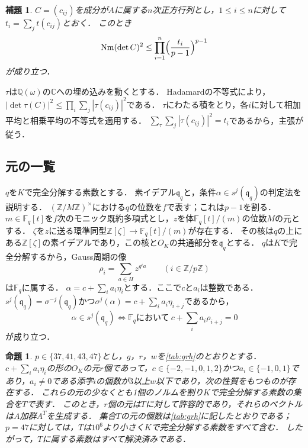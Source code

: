 \documentclass[11pt,a4paper]{ltjsarticle}
\makeatletter
\theoremstyle{ja}
\newtheorem{proposition}[theorem]{命題}
\newtheorem{lemma}[theorem]{補題}
\renewenvironment{proof}[1][証明]{\par
  \pushQED{\qed}\normalfont \topsep6\p@\@plus6\p@\relax
  \trivlist
  \item[\hskip\labelsep\bfseries #1]\hspace{1\zw}\ignorespaces
}{\popQED\endtrivlist\@endpefalse}
\makeatother
\begin{document}
\begin{lemma} \label{lem:hadamard}
$C = (c_{ij})$を成分が$A$に属する$n$次正方行列とし，$1 \le i \le n$に対して$t_i = \sum_{j} t(c_{ij})$とおく．
このとき
\[
\operatorname{Nm}(\det C)^2 \le \prod_{i=1}^{n} \Bigl( \frac{t_i}{p-1} \Bigr)^{p-1}
\]
が成り立つ．
\end{lemma}

\begin{proof}
$\tau$は$\mathbb{Q}(\omega)$の$\mathbb{C}$への埋め込みを動くとする．
Hadamardの不等式により，$|\det \tau(C)|^2 \le \prod_i \sum_j |\tau(c_{ij})|^2$である．
$\tau$にわたる積をとり，各$i$に対して相加平均と相乗平均の不等式を適用する．
$\sum_\tau \sum_j |\tau(c_{ij})|^2 = t_i$であるから，主張が従う．
\end{proof}

\subsection{元の一覧}

$q$を$K$で完全分解する素数とする．
素イデアル$\mathfrak{q}_q$と，条件$\alpha \in s^j(\mathfrak{q}_q)$の判定法を説明する．
$(\mathbb{Z}/M\mathbb{Z})^\times$における$q$の位数を$f$で表す；これは$p - 1$を割る．
$m \in \mathbb{F}_q[t]$を$f$次のモニック既約多項式とし，$z$を体$\mathbb{F}_q[t]/(m)$の位数$M$の元とする．
$\zeta$を$z$に送る環準同型$\mathbb{Z}[\zeta] \to \mathbb{F}_q[t]/(m)$が存在する．
その核は$q$の上にある$\mathbb{Z}[\zeta]$の素イデアルであり，この核と$O_K$の共通部分を$\mathfrak{q}_q$とする．
$q$は$K$で完全分解するから，Gauss周期の像
\[
\rho_i = \sum_{a \in H} z^{g^i a} \qquad (i \in \mathbb{Z}/p\mathbb{Z})
\]
は$\mathbb{F}_q$に属する．
$\alpha = c + \sum_i a_i \eta_i$とする．ここで$c$と$a_i$は整数である．
$s^j(\mathfrak{q}_q) = \sigma^{-j}(\mathfrak{q}_q)$かつ$\sigma^j(\alpha) = c + \sum_i a_i \eta_{i+j}$であるから，
\begin{equation} \label{eq:test}
\alpha \in s^j(\mathfrak{q}_q) \iff \text{$\mathbb{F}_q$において}\ c + \sum_i a_i \rho_{i+j} = 0
\end{equation}
が成り立つ．

\begin{proposition} \label{prop:datagrh}
$p \in \{37, 41, 43, 47\}$とし，$g$，$r$，$w$を\cref{tab:grh}のとおりとする．
$c + \sum_i a_i \eta_i$の形の$O_K$の元$r$個であって，$c \in \{-2, -1, 0, 1, 2\}$かつ$a_i \in \{-1, 0, 1\}$であり，$a_i \ne 0$である添字$i$の個数が$3$以上$w$以下であり，次の性質をもつものが存在する．
これらの元の少なくとも1個のノルムを割り$K$で完全分解する素数の集合を$T$で表す．
このとき，$r$個の元は$T$に対して許容的であり，それらのベクトルは$A$加群$A^T$を生成する．
集合$T$の元の個数は\cref{tab:grh}に記したとおりである；$p = 47$に対しては，$T$は$10^6$より小さく$K$で完全分解する素数をすべて含む．
したがって，$T$に属する素数はすべて解決済みである．
\end{proposition}
\end{document}
